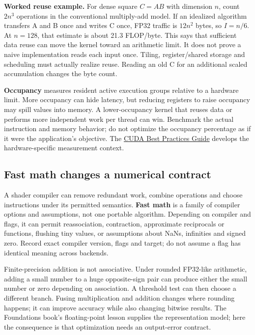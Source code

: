 \textbf{Worked reuse example.} For dense square \(C=AB\) with dimension \(n\), count \(2n^3\) operations in the conventional multiply-add model. If an idealized algorithm transfers A and B once and writes C once, FP32 traffic is \(12n^2\) bytes, so \(I=n/6\). At \(n=128\), that estimate is about 21.3 FLOP/byte. This says that sufficient data reuse can move the kernel toward an arithmetic limit. It does not prove a naive implementation reads each input once. Tiling, register/shared storage and scheduling must actually realize reuse. Reading an old C for an additional scaled accumulation changes the byte count.

\textbf{Occupancy} measures resident active execution groups relative to a hardware limit. More occupancy can hide latency, but reducing registers to raise occupancy may spill values into memory. A lower-occupancy kernel that reuses data or performs more independent work per thread can win. Benchmark the actual instruction and memory behavior; do not optimize the occupancy percentage as if it were the application's objective. The \href{https://docs.nvidia.com/cuda/cuda-c-best-practices-guide/index.html}{CUDA Best Practices Guide} develops the hardware-specific measurement context.

\subsection{Fast math changes a numerical contract}\label{03-visual-computing-i-ch016-fast-math-changes-a-numerical-contract}

\hypertarget{03-visual-computing-i-ch016-fast-math-changes-a-numerical-contract}{}

A shader compiler can remove redundant work, combine operations and choose instructions under its permitted semantics. \textbf{Fast math} is a family of compiler options and assumptions, not one portable algorithm. Depending on compiler and flags, it can permit reassociation, contraction, approximate reciprocals or functions, flushing tiny values, or assumptions about NaNs, infinities and signed zero. Record exact compiler version, flags and target; do not assume a flag has identical meaning across backends.

Finite-precision addition is not associative. Under rounded FP32-like arithmetic, adding a small number to a huge opposite-sign pair can produce either the small number or zero depending on association. A threshold test can then choose a different branch. Fusing multiplication and addition changes where rounding happens; it can improve accuracy while also changing bitwise results. The Foundations book's floating-point lesson supplies the representation model; here the consequence is that optimization needs an output-error contract.

